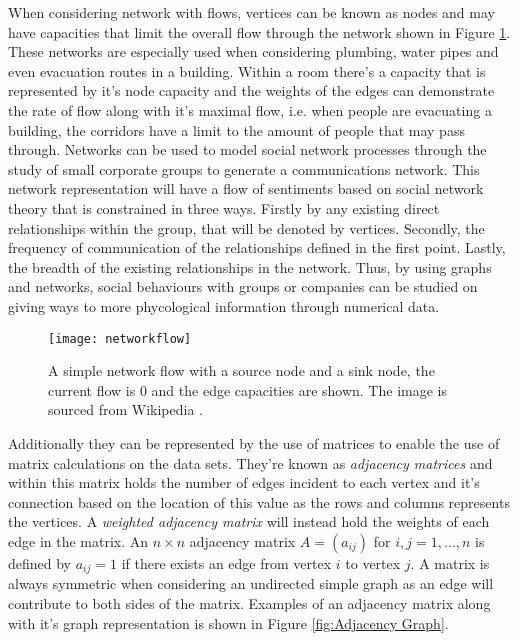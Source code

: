 When considering network with flows, vertices can be known as nodes and may have capacities that limit the overall flow through the network shown in Figure \ref{fig:Network Flow}. These networks are especially used when considering plumbing, water pipes and even evacuation routes in a building. Within a room there's a capacity that is represented by it's node capacity and the weights of the edges can demonstrate the rate of flow along with it's maximal flow, i.e. when people are evacuating a building, the corridors have a limit to the amount of people that may pass through. Networks can be used to model social network processes through the study of small corporate groups to generate a communications network. This network representation will have a flow of sentiments based on social network theory\cite{ZACHARY1984259} that is constrained in three ways. Firstly by any existing direct relationships within the group, that will be denoted by vertices. Secondly, the frequency of communication of the relationships defined in the first point. Lastly, the breadth of the existing relationships in the network. Thus, by using graphs and networks, social behaviours with groups or companies can be studied on giving ways to more phycological information through numerical data.
\newline

\begin{figure}[!htb]
\centering
\texttt{[image: networkflow]}
\caption{A simple network flow with a source node and a sink node, the current flow is 0 and the edge capacities are shown. The image is sourced from Wikipedia \cite{wikinetwork}.}
\label{fig:Network Flow}
\end{figure}

Additionally they can be represented by the use of matrices to enable the use of matrix calculations on the data sets. They're known as \emph{adjacency matrices}\cite{KnauerU.2011Agt:} and within this matrix holds the number of edges incident to each vertex and it's connection based on the location of this value as the rows and columns represents the vertices. A \emph{weighted adjacency matrix} will instead hold the weights of each edge in the matrix. An $n \times n$ adjacency matrix $A = (a_{ij})$ for $ i, j = 1, ..., n$ is defined by $a_{ij} = 1$ if there exists an edge from vertex $i$ to vertex $j$. A matrix is always symmetric when considering an undirected simple graph as an edge will contribute to both sides of the matrix. Examples of an adjacency matrix along with it's graph representation is shown in Figure \ref{fig:Adjacency Graph}.
\newline

